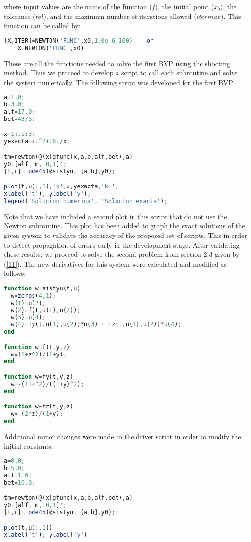 \documentclass{article}
\begin{document}
where input values are the name of the function ($f$), the initial point ($x_0$), the tolerance ($tol$), and the maximum number of iterations allowed ($itermax$). This function can be called by:

\begin{lstlisting}[language=Octave]
    [X,ITER]=NEWTON('FUNC',x0,1.0e-6,100)    or
    X=NEWTON('FUNC',x0)
\end{lstlisting}

These are all the functions needed to solve the first BVP using the shooting method. Thus we proceed to develop a script to call each subroutine and solve the system numerically. The following script was developed for the first BVP: 

\begin{lstlisting}[language=Octave]
a=1.0;
b=3.0;
alf=17.0;
bet=43/3;

x=1:.1:3;
yexacta=x.^2+16./x;

tm=newton(@(x)gfunc(x,a,b,alf,bet),a)
y0=[alf,tm, 0,1]';
[t,u]= ode45(@sistyu, [a,b],y0);

plot(t,u(:,1),'k',x,yexacta,'k+')
xlabel('t'); ylabel('y');
legend('Solucion numerica', 'Solucion exacta');
\end{lstlisting}

Note that we have included a second plot in this script that do not use the Newton subroutine. This plot has been added to graph the exact solutions of the given system to validate the accuracy of the proposed set of scripts. This in order to detect propagation of errors early in the development stage. After validating these results, we proceed to solve the second problem from section 2.3 given by (\ref{11}). The new derivatives for this system were calculated and modified as follows:

\begin{lstlisting}[language=Octave]
function w=sistyu(t,u)
  w=zeros(4,1);
  w(1)=u(2);
  w(2)=f(t,u(1),u(2));
  w(3)=u(4);
  w(4)=fy(t,u(1),u(2))*u(3) + fz(t,u(1),u(2))*u(4);
end 

function w=f(t,y,z)
  w=(1+z^2)/(1+y);
end

function w=fy(t,y,z)
  w=-(1+z^2)/((1+y)^2);
end

function w=fz(t,y,z)
  w= (2*z)/(1+y);
end
\end{lstlisting}

Additional minor changes were made to the driver script in order to modify the initial constants:

\begin{lstlisting}[language=Octave]
a=0.0;
b=5.0;
alf=1.0;
bet=10.0;

tm=newton(@(x)gfunc(x,a,b,alf,bet),a)
y0=[alf,tm, 0,1]';
[t,u]= ode45(@sistyu, [a,b],y0);

plot(t,u(:,1))
xlabel('t'); ylabel('y')
\end{lstlisting}
\end{document}
